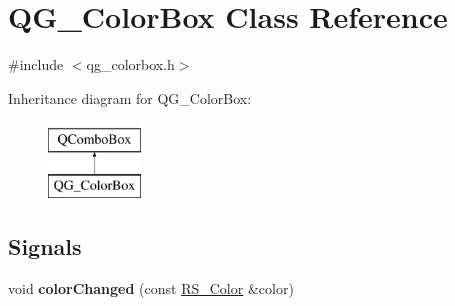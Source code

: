 \hypertarget{classQG__ColorBox}{\section{Q\-G\-\_\-\-Color\-Box Class Reference}
\label{classQG__ColorBox}
}


{\ttfamily \#include $<$qg\-\_\-colorbox.\-h$>$}

Inheritance diagram for Q\-G\-\_\-\-Color\-Box\-:\begin{figure}[H]
\begin{center}
\leavevmode
\includegraphics[height=2.000000cm]{classQG__ColorBox}
\end{center}
\end{figure}
\subsection*{Signals}
\begin{DoxyCompactItemize}
\item 
\hypertarget{classQG__ColorBox_ad0204ceab0506e5e3844ff3d205d48df}{void {\bfseries color\-Changed} (const \hyperlink{classRS__Color}{R\-S\-\_\-\-Color} \&color)}\label{classQG__ColorBox_ad0204ceab0506e5e3844ff3d205d48df}

\end{DoxyCompactItemize}
